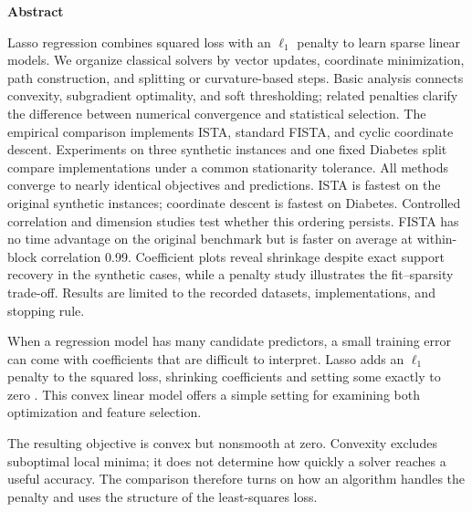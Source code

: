 \documentclass[10pt,letterpaper]{article}
\makeatletter
\renewcommand{\section}{\@startsection{section}{1}{\z@}{-2ex plus-.5ex minus-.2ex}{1.2ex plus.2ex}{\fontsize{12}{14}\selectfont\bfseries\raggedright}}
\makeatother
\begin{document}
\begingroup
\renewcommand{\thefootnote}{\ensuremath{*}}
\endgroup
\vspace{4pt}
\begin{center}\fontsize{12}{14}\selectfont\bfseries Abstract\end{center}
\begin{list}{}{\setlength{\leftmargin}{.5in}\setlength{\rightmargin}{.5in}}
\item[]
Lasso regression combines squared loss with an $\ell_1$ penalty to learn sparse linear models. We organize classical solvers by vector updates, coordinate minimization, path construction, and splitting or curvature-based steps. Basic analysis connects convexity, subgradient optimality, and soft thresholding; related penalties clarify the difference between numerical convergence and statistical selection. The empirical comparison implements ISTA, standard FISTA, and cyclic coordinate descent. Experiments on three synthetic instances and one fixed Diabetes split compare implementations under a common stationarity tolerance. All methods converge to nearly identical objectives and predictions. ISTA is fastest on the original synthetic instances; coordinate descent is fastest on Diabetes. Controlled correlation and dimension studies test whether this ordering persists. FISTA has no time advantage on the original benchmark but is faster on average at within-block correlation 0.99. Coefficient plots reveal shrinkage despite exact support recovery in the synthetic cases, while a penalty study illustrates the fit--sparsity trade-off. Results are limited to the recorded datasets, implementations, and stopping rule.
\end{list}
\vspace{3pt}
\section{Introduction}
When a regression model has many candidate predictors, a small training error can come with coefficients that are difficult to interpret. Lasso adds an $\ell_1$ penalty to the squared loss, shrinking coefficients and setting some exactly to zero \citep{tibshirani1996}. This convex linear model offers a simple setting for examining both optimization and feature selection.

The resulting objective is convex but nonsmooth at zero. Convexity excludes suboptimal local minima; it does not determine how quickly a solver reaches a useful accuracy. The comparison therefore turns on how an algorithm handles the penalty and uses the structure of the least-squares loss.
\end{document}
